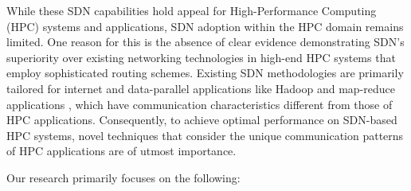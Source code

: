 While these SDN capabilities hold appeal for High-Performance Computing (HPC)
systems and applications, SDN adoption within the HPC domain remains limited.
One reason for this is the absence of clear evidence demonstrating SDN's
superiority over existing networking technologies in high-end HPC systems that
employ sophisticated routing schemes. Existing SDN methodologies are primarily
tailored for internet and data-parallel applications like Hadoop and map-reduce
applications \cite{he2016firebird}, which have communication characteristics different from those
of HPC applications. Consequently, to achieve optimal performance on SDN-based
HPC systems, novel techniques that consider the unique communication patterns of HPC
applications are of utmost importance. 

\begin{comment}
Many HPC applications involve simulating physical
processes across numerous time steps, where each step entails similar tasks.
This results in phased behavior characterized by alternating computation and
communication phases often
repeating across different time steps and being static, as known to application
developers \cite{faraj2002communication} \cite{hong2013achieving}. Leveraging such static communication information can enhance
SDN's ability to support communications effectively and perform tasks
efficiently. Considering these characteristics, I develop SDN techniques
tailored for HPC systems. Flow identification plays a crucial role in this
process, as accurately classifying flows is essential for achieving high
performance in an SDN-capable network. 

The focus of this work lies particularly on
identifying elephant flows \cite{he2016firebird}, which are flows with substantial data volumes,
as they typically dominate communication time in HPC applications. Subsequently,
we devise SDN-enhanced routing functions to adeptly schedule these elephant
flows and allocate optimal network resources. Building upon the first part of the work done 
on optimal system configurations, we will evaluate these new algorithms across
various interconnect topologies.  Such evaluations hold significant implications
for scientific computing, enabling researchers to harness the full potential of
HPC resources for groundbreaking discoveries across various fields.
\end{comment}


Our research primarily focuses on the following:

